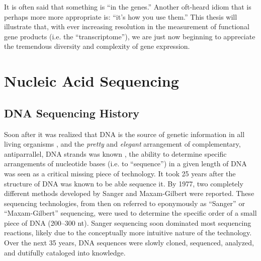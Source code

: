   It is often said that something is ``in the genes.'' Another oft-heard idiom that is perhaps more more appropriate is: ``it's how you use them.'' This thesis will illustrate that, with ever increasing resolution in the measurement of functional gene products (i.e. the ``transcriptome''), we are just now beginning to appreciate the tremendous diversity and complexity of gene expression.

\section{Nucleic Acid Sequencing}
  \label{Intro:sec:Nucleic Acid Sequencing}

  \subsection{DNA Sequencing History}
    \label{Intro:subsec:DNA Sequencing History}

    Soon after it was realized that DNA is the source of genetic information in all living organisms \citep{Watson1953a}, and the \textit{pretty} and \textit{elegant} arrangement of complementary, antiparrallel, DNA strands was known \citep{Watson2012a}, the ability to determine specific arrangements of nucleotide bases (i.e. to ``sequence'') in a given length of DNA was seen as a critical missing piece of technology. It took 25 years after the structure of DNA was known to be able sequence it. By 1977, two completely different methods developed by Sanger \citep{Sanger1975a,Sanger1977b} and Maxam-Gilbert \citep{Maxam1977a} were reported. These sequencing technologies, from then on referred to eponymously as ``Sanger'' or ``Maxam-Gilbert'' sequencing, were used to determine the specific order of a small piece of DNA (200–300 nt). Sanger sequencing soon dominated most sequencing reactions, likely due to the conceptually more intuitive nature of the technology. Over the next 35 years, DNA sequences were slowly cloned, sequenced, analyzed, and dutifully cataloged into knowledge.

